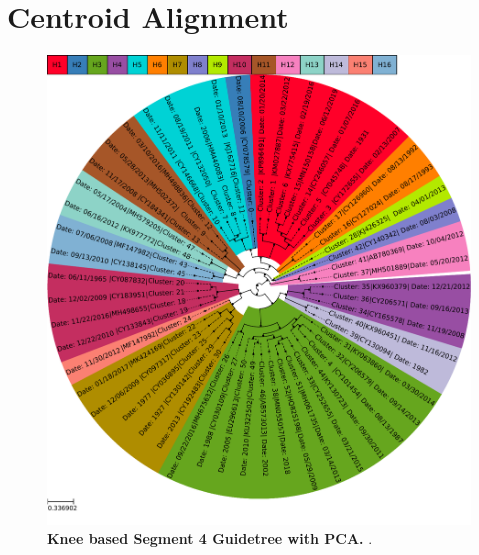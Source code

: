\section{Centroid Alignment} \label{sec:Centroid_Alignment}

\blindtext

\begin{figure}[!hbt]
    \includegraphics[width=\dimexpr\textwidth-2\fboxsep-2\fboxrule,fbox]{PCA/Guidetree_segment_4_H_Centroid.pdf}
    \caption[Knee based Segment 4 Guidetree with \Acrshort{PCA}]{\textbf{Knee based Segment 4 Guidetree with \Acrshort{PCA}.} .}
    \label{fig:PCA_Guidetree_Centroid_4}
\end{figure}

\blindtext

